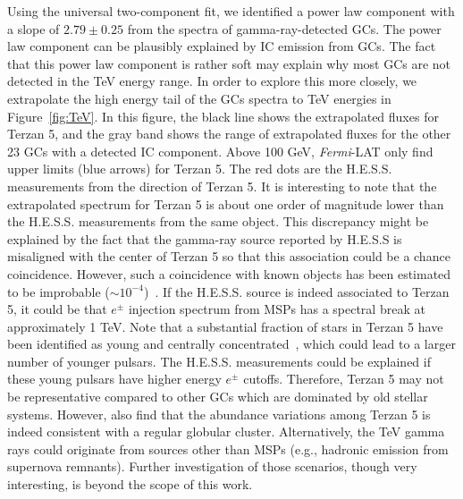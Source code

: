 \documentclass[doublespace,nopageskip]{VTthesis} %
\begin{document}
Using the universal two-component fit, we identified a power law component with a slope of $2.79 \pm  0.25$ from the spectra of gamma-ray-detected GCs. The power law component can be plausibly explained by IC emission from GCs. The fact that this power law component is rather soft may explain why most GCs are not detected in the TeV energy range. In order to explore this more closely, we extrapolate the high energy tail of the GCs spectra to TeV energies in Figure~\ref{fig:TeV}. In this figure, the black line shows the extrapolated fluxes for Terzan 5, and the gray band shows the range of extrapolated fluxes for the other 23 GCs with a detected IC component. Above 100 GeV, {\it Fermi}-LAT only find upper limits (blue arrows) for Terzan 5. The red dots are the H.E.S.S. measurements from the direction of Terzan 5. It is interesting to note that the extrapolated spectrum for Terzan 5 is about one order of magnitude lower than the H.E.S.S. measurements from the same object. This discrepancy might be explained by the fact that the gamma-ray source reported by H.E.S.S is misaligned with the center of Terzan 5 so that this association could be a chance coincidence. However, such a coincidence with known objects has been estimated to be improbable ($\sim 10^{-4}$)~\citep{2011A&A...531L..18H}. If the H.E.S.S. source is indeed associated to Terzan 5, it could be that $e^\pm$ injection spectrum from MSPs has a spectral break at approximately 1 TeV. Note that a substantial fraction of stars in Terzan 5 have been identified as young and centrally concentrated~\citep{2016ApJ...828...75F,2020BAAA..61R...90G}, which could lead to a larger number of younger pulsars. The H.E.S.S. measurements could be explained if these young pulsars have higher energy $e^\pm$ cutoffs. Therefore, Terzan 5 may not be representative compared to other GCs which are dominated by old stellar systems. However, \citet{2019AJ....158...14N} also find that the abundance variations among Terzan 5 is indeed consistent with a regular globular cluster. Alternatively, the TeV gamma rays could originate from sources other than MSPs (e.g., hadronic emission from supernova remnants). Further investigation of those scenarios, though very interesting, is beyond the scope of this work. 
\end{document}
